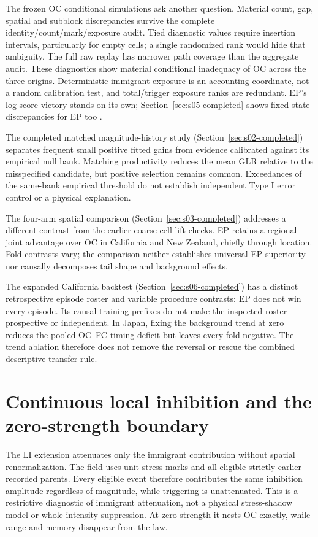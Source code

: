 The frozen OC conditional simulations ask another question. Material count, gap, spatial and subblock discrepancies survive the complete identity/count/mark/exposure audit. Tied diagnostic values require insertion intervals, particularly for empty cells; a single randomized rank would hide that ambiguity. The full raw replay has narrower path coverage than the aggregate audit. These diagnostics show material conditional inadequacy of OC across the three origins. Deterministic immigrant exposure is an accounting coordinate, not a random calibration test, and total/trigger exposure ranks are redundant. EP's log-score victory stands on its own; Section~\ref{sec:s05-completed} shows fixed-state discrepancies for EP too \citep{Schorlemmer2007,Zechar2010}.

The completed matched magnitude-history study (Section~\ref{sec:s02-completed}) separates frequent small positive fitted gains from evidence calibrated against its empirical null bank. Matching productivity reduces the mean GLR relative to the misspecified candidate, but positive selection remains common. Exceedances of the same-bank empirical threshold do not establish independent Type I error control or a physical explanation.

The four-arm spatial comparison (Section~\ref{sec:s03-completed}) addresses a different contrast from the earlier coarse cell-lift checks. EP retains a regional joint advantage over OC in California and New Zealand, chiefly through location. Fold contrasts vary; the comparison neither establishes universal EP superiority nor causally decomposes tail shape and background effects.

The expanded California backtest (Section~\ref{sec:s06-completed}) has a distinct retrospective episode roster and variable procedure contrasts: EP does not win every episode. Its causal training prefixes do not make the inspected roster prospective or independent. In Japan, fixing the background trend at zero reduces the pooled OC--FC timing deficit but leaves every fold negative. The trend ablation therefore does not remove the reversal or rescue the combined descriptive transfer rule.

\section{Continuous local inhibition and the zero-strength boundary}

The LI extension attenuates only the immigrant contribution without spatial renormalization. The field uses unit stress marks and all eligible strictly earlier recorded parents. Every eligible event therefore contributes the same inhibition amplitude regardless of magnitude, while triggering is unattenuated. This is a restrictive diagnostic of immigrant attenuation, not a physical stress-shadow model or whole-intensity suppression. At zero strength it nests OC exactly, while range and memory disappear from the law.

